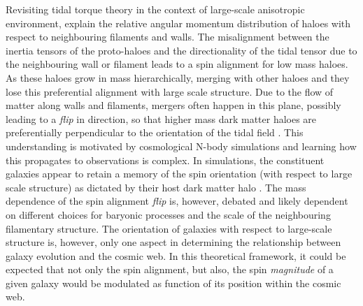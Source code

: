 Revisiting tidal torque theory \citep[TTT; e.g.][]{hoyle1951, peebles1969} in the context of large-scale anisotropic environment, \citet{codis2015} explain the relative angular momentum distribution of haloes with respect to neighbouring filaments and walls. The misalignment between the inertia tensors of the proto-haloes and the directionality of the tidal tensor due to the neighbouring wall or filament leads to a spin alignment for low mass haloes. As these haloes grow in mass hierarchically, merging with other haloes and they lose this preferential alignment with large scale structure. Due to the flow of matter along walls and filaments, mergers often happen in this plane, possibly leading to a \textit{flip} in direction, so that higher mass dark matter haloes are preferentially perpendicular to the orientation of the tidal field \citep[e.g.][]{Codis2012, dubois2014, GaneshaiahVeena2018}. This understanding is motivated by cosmological N-body simulations and learning how this propagates to observations is complex. In simulations, the constituent galaxies appear to retain a memory of the spin orientation (with respect to large scale structure) as dictated by their host dark matter halo \citep[e.g.][]{codis2018, Kraljic2019flip}. The mass dependence of the spin alignment \textit{flip} is, however, debated and likely dependent on different choices for baryonic processes and the scale of the neighbouring filamentary structure. The orientation of galaxies with respect to large-scale structure is, however, only one aspect in determining the relationship between galaxy evolution and the cosmic web. In this theoretical framework, it could be expected that not only the spin alignment, but also, the spin \textit{magnitude} of a given galaxy would be modulated as function of its position within the cosmic web.


